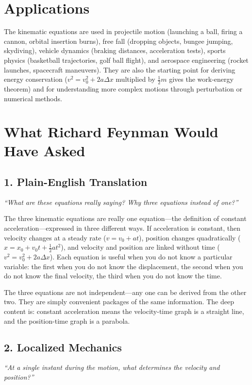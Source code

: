 \section*{Applications}

The kinematic equations are used in projectile motion (launching a ball, firing a cannon, orbital insertion burns), free fall (dropping objects, bungee jumping, skydiving), vehicle dynamics (braking distances, acceleration tests), sports physics (basketball trajectories, golf ball flight), and aerospace engineering (rocket launches, spacecraft maneuvers). They are also the starting point for deriving energy conservation ($v^2 = v_0^2 + 2a\Delta x$ multiplied by $\frac{1}{2}m$ gives the work-energy theorem) and for understanding more complex motions through perturbation or numerical methods.
\section*{What Richard Feynman Would Have Asked}

\subsection*{1. Plain-English Translation}
\textit{``What are these equations really saying? Why three equations instead of one?''}

The three kinematic equations are really one equation---the definition of constant acceleration---expressed in three different ways. If acceleration is constant, then velocity changes at a steady rate ($v = v_0 + at$), position changes quadratically ($x = x_0 + v_0 t + \frac{1}{2}at^2$), and velocity and position are linked without time ($v^2 = v_0^2 + 2a\Delta x$). Each equation is useful when you do not know a particular variable: the first when you do not know the displacement, the second when you do not know the final velocity, the third when you do not know the time.

The three equations are not independent---any one can be derived from the other two. They are simply convenient packages of the same information. The deep content is: constant acceleration means the velocity-time graph is a straight line, and the position-time graph is a parabola.

\subsection*{2. Localized Mechanics}
\textit{``At a single instant during the motion, what determines the velocity and position?''}

